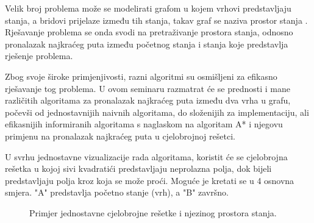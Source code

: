 Velik broj problema može se modelirati grafom u kojem vrhovi predstavljaju stanja, a bridovi prijelaze između tih stanja, takav graf se naziva prostor stanja .
Rješavanje problema se onda svodi na pretraživanje prostora stanja, odnosno pronalazak najkraćeg puta između početnog stanja i stanja koje predstavlja rješenje problema.


Zbog svoje široke primjenjivosti, razni algoritmi su osmišljeni za efikasno rješavanje tog problema. U ovom seminaru razmatrat će se prednosti i mane različitih algoritama za pronalazak najkraćeg puta između dva vrha u grafu, počevši od jednostavnijih naivnih algoritama,  do složenijih za implementaciju, ali efikasnijih informiranih algoritama s naglaskom na algoritam A* i njegovu primjenu na pronalazak najkraćeg puta u cjelobrojnoj rešetci. 

U svrhu jednostavne vizualizacije rada algoritama, koristit će se cjelobrojna rešetka u kojoj sivi kvadratići predstavljaju neprolazna polja, dok bijeli predstavljaju polja kroz koja se može proći. Moguće je kretati se u 4 osnovna smjera. "A" predstavlja početno stanje (vrh), a "B" završno. 

\begin{figure}[h]
	\centering
	
	\caption{Primjer jednostavne cjelobrojne rešetke i njezinog prostora stanja.} 
\end{figure}



